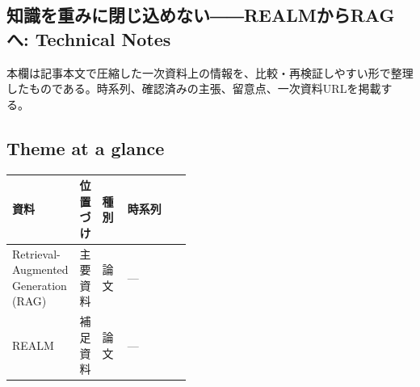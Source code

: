 \subsection*{知識を重みに閉じ込めない――REALMからRAGへ: Technical Notes}
本欄は記事本文で圧縮した一次資料上の情報を、比較・再検証しやすい形で整理したものである。時系列、確認済みの主張、留意点、一次資料URLを掲載する。
\smallskip
{}\par
\medskip
\subsection*{Theme at a glance}
\begin{center}
\footnotesize
\begin{tabularx}{\linewidth}{@{}p{0.20\linewidth}p{0.10\linewidth}p{0.14\linewidth}X@{}}
\toprule
資料 & 位置づけ & 種別 & 時系列 \\
\midrule
Retrieval-Augmented Generation (RAG) & 主要資料 & 論文 & — \\
REALM & 補足資料 & 論文 & — \\
\bottomrule
\end{tabularx}
\end{center}
\normalsize

